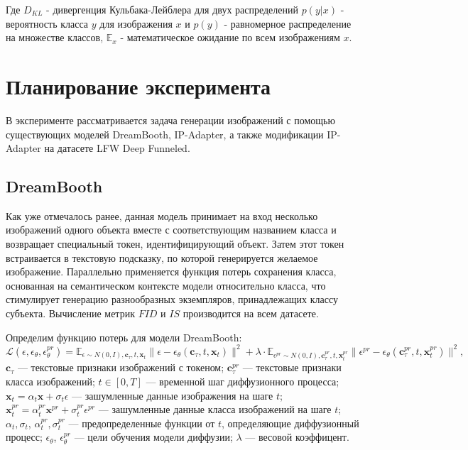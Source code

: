 \documentclass{article}
\begin{document}
Где \( D_{KL} \) - дивергенция Кульбака-Лейблера для двух распределений \(p(y|x)\) - вероятность класса \(y\) для изображения \(x\) и \(p(y)\) - равномерное распределение на множестве классов, \( \mathbb{E}_x \) - математическое ожидание по всем изображениям \(x\).

\section{Планирование эксперимента}
В эксперименте рассматривается задача генерации изображений с помощью существующих моделей DreamBooth, IP-Adapter, а также модификации IP-Adapter на датасете LFW Deep Funneled.

\subsection{DreamBooth}
Как уже отмечалось ранее, данная модель принимает на вход несколько изображений одного объекта вместе с соответствующим названием класса и возвращает специальный токен, идентифицирующий объект. Затем этот токен встраивается в текстовую подсказку, по которой генерируется желаемое изображение. Параллельно применяется функция потерь сохранения класса, основанная на семантическом контексте модели относительно класса, что стимулирует генерацию разнообразных экземпляров, принадлежащих классу субъекта. Вычисление метрик $FID$ и $IS$ производится на всем датасете.\par
Определим функцию потерь для модели DreamBooth:
\begin{equation}
\mathcal{L}(\epsilon, \epsilon_{\theta}, \epsilon^{pr}_{\theta}) = \mathbb{E}_{\epsilon \sim N(0, I),\mathbf{c}_{\tau}, t, \mathbf{x}_{t}} \|\epsilon - \epsilon_{\theta}(\mathbf{c}_{\tau}, t, \mathbf{x}_{t})\|^2 + \lambda \cdot \mathbb{E}_{\epsilon^{pr} \sim N(0, I),\mathbf{c}^{pr}_{\tau}, t, \mathbf{x}^{pr}_{t}} \|\epsilon^{pr} - \epsilon_{\theta}(\mathbf{c}^{pr}_{\tau}, t, \mathbf{x}^{pr}_{t})\|^2,
\end{equation}
$\mathbf{c}_{\tau}$ --- текстовые признаки изображений с токеном; $\mathbf{c}^{pr}_{\tau}$ --- текстовые признаки класса изображений; $t \in [0, T]$ --- временной шаг диффузионного процесса; $\mathbf{x}_{t} = \alpha_t \mathbf{x}  + \sigma_t \epsilon$ --- зашумленные данные изображения на шаге $t$; $\mathbf{x}^{pr}_{t} = \alpha_t^{pr} \mathbf{x}^{pr}  + \sigma_t^{pr} \epsilon^{pr}$ --- зашумленные данные класса изображений на шаге $t$; $\alpha_t, \sigma_t$, $\alpha^{pr}_t, \sigma^{pr}_t$ --- предопределенные функции от $t$, определяющие диффузионный процесс; $\epsilon_{\theta}$, $\epsilon^{pr}_{\theta}$ --- цели обучения модели диффузии; $\lambda$ --- 
весовой коэффицент.
\end{document}
